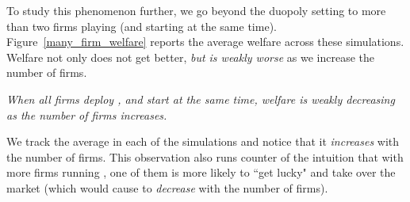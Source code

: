 \documentclass[../competing_bandits_with_appendix.tex]{subfiles}
\begin{document}
To study this phenomenon further, we go beyond the duopoly setting to more than two firms playing \DynamicGreedy (and starting at the same time). Figure~\ref{many_firm_welfare} reports the average welfare
across these simulations. Welfare not only does not get better, \textit{but is weakly worse} as we increase the number of firms.

\begin{finding}
\textit{When all firms deploy \DynamicGreedy, and start at the same time, welfare is weakly decreasing as the number of firms increases.}
\end{finding}


We track the average \Eeog in each of the
simulations and notice that it \textit{increases} with the number of firms.
This observation also runs counter of the intuition that with more firms running \DynamicGreedy, one of them is more likely to ``get lucky" and take over the market (which would cause \Eeog to \emph{decrease} with the number of firms).

\end{document}
